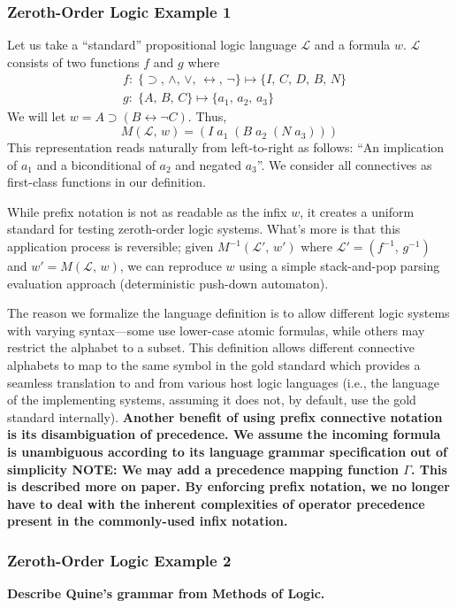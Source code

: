 \documentclass[ms]{uncgdissertationexp2}
\theoremstyle{plain}
\theoremstyle{definition}
\theoremstyle{remark}
\begin{document}
\subsubsection{Zeroth-Order Logic Example 1} Let us take a ``standard'' propositional logic language $\mathcal{L}$ and a formula $w$. $\mathcal{L}$ consists of two functions $f$ and $g$ where
\begin{align*}
	  & f:\;\{\supset,\,\land,\,\lor,\,\leftrightarrow,\,\lnot\}\mapsto \{I,\,C,\,D,\,B,\,N\} \\
	  & g:\;\{A,\,B,\,C\} \mapsto \{a_{1},\,a_{2},\,a_{3}\}                                   
\end{align*}
We will let $w = A \supset (B \leftrightarrow \lnot C)$. Thus, 
\[
	M(\mathcal{L},\,w) = (I\;a_{1}\;(B\;a_{2}\;(N\;a_{3})))
\]
This representation reads naturally from left-to-right as follows: ``An implication of $a_1$ and a biconditional of $a_2$ and negated $a_3$''. We consider all connectives as first-class functions in our definition.

While prefix notation is not as readable as the infix $w$, it creates a uniform standard for testing zeroth-order logic systems. What's more is that this application process is reversible; given $M^{-1}(\mathcal{L}',\,w')$ where $\mathcal{L}' = (f^{-1},\,g^{-1})$ and $w' = M(\mathcal{L},\,w)$, we can reproduce $w$ using a simple stack-and-pop parsing evaluation approach (deterministic push-down automaton).
    
The reason we formalize the language definition is to allow different logic systems with varying syntax---some use lower-case atomic formulas, while others may restrict the alphabet to a subset. This definition allows different connective alphabets to map to the same symbol in the gold standard which provides a seamless translation to and from various host logic languages (i.e., the language of the implementing systems, assuming it does not, by default, use the gold standard internally). \textbf{Another benefit of using prefix connective notation is its disambiguation of precedence. We assume the incoming formula is unambiguous according to its language grammar specification out of simplicity NOTE: We may add a precedence mapping function $\Gamma$. This is described more on paper. By enforcing prefix notation, we no longer have to deal with the inherent complexities of operator precedence present in the commonly-used infix notation.}
\subsubsection{Zeroth-Order Logic Example 2}
\textbf{Describe Quine's grammar from Methods of Logic.}
\end{document}
